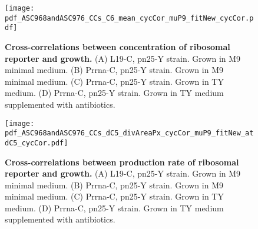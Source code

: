 

\begin{figure}
    \centering
    \texttt{[image: pdf\_ASC968andASC976\_CCs\_C6\_mean\_cycCor\_muP9\_fitNew\_cycCor.pdf]}
    \caption{ 
        \textbf{Cross-correlations between concentration of ribosomal reporter and growth.}
        (A) L19-C, pn25-Y strain. Grown in M9 minimal medium.
        (B) Prrna-C, pn25-Y strain. Grown in M9 minimal medium.
        (C) Prrna-C, pn25-Y strain. Grown in TY medium.
        (D) Prrna-C, pn25-Y strain. Grown in TY medium supplemented with antibiotics.
    }
    \label{fig:ribo:CCsEmuY}
\end{figure}

\begin{figure}
    \centering
    \texttt{[image: pdf\_ASC968andASC976\_CCs\_dC5\_divAreaPx\_cycCor\_muP9\_fitNew\_atdC5\_cycCor.pdf]}
    \caption{ 
        \textbf{Cross-correlations between production rate of ribosomal reporter and growth.}
        (A) L19-C, pn25-Y strain. Grown in M9 minimal medium.
        (B) Prrna-C, pn25-Y strain. Grown in M9 minimal medium.
        (C) Prrna-C, pn25-Y strain. Grown in TY medium.
        (D) Prrna-C, pn25-Y strain. Grown in TY medium supplemented with antibiotics.
    }
    \label{fig:ribo:CCsPmuY}
\end{figure}



